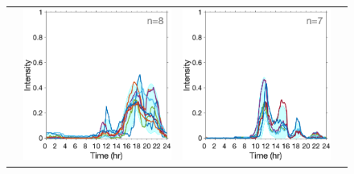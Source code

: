 \documentclass{article}
\begin{document}
\begin{figure}[h!]
\begin{center}
\begin{tabular}{cccc}
			&\hspace*{-0.6cm}
			\includegraphics[scale=0.1]{../2Fittedy/plot/holiday_5/fitted_y_cluster5_3.eps} 
			&\hspace*{-0.6cm}
			\includegraphics[scale=0.1]{../2Fittedy/plot/holiday_5/fitted_y_cluster5_4.eps} \\
			

\end{tabular}
\end{center}
\end{figure}
\end{document}
